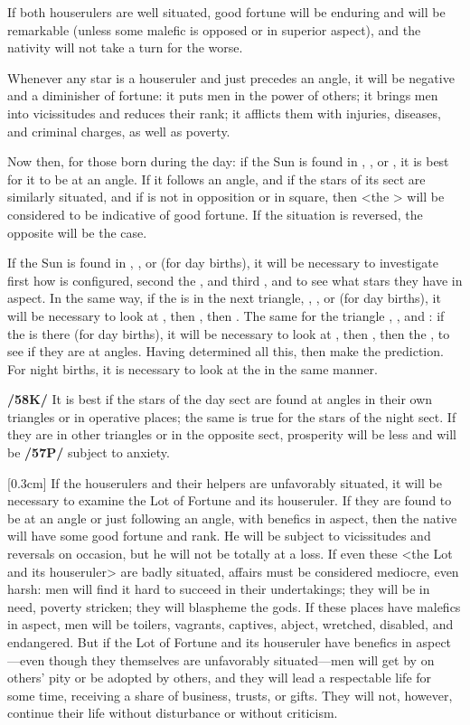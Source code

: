 If both houserulers are well situated, good fortune will be enduring and will be remarkable (unless some malefic is opposed or in superior aspect), and the nativity will not take a turn for the worse. 

Whenever any star is a houseruler and just precedes an angle, it will be negative and a diminisher of fortune: it puts men in the power of others; it brings men into vicissitudes and reduces their rank; it afflicts them with injuries, diseases, and criminal charges, as well as poverty.

Now then, for those born during the day: if the Sun is found in \Aries, \Leo, or \Sagittarius, it is best for it to be at an angle. If it follows an angle, and if the stars of its sect are similarly situated, and if \Mars\xspace is not in opposition or in square, then <the \Sun> will be considered to be indicative of good fortune. If the situation is reversed, the opposite will be the case. 

If the Sun is found in \Taurus, \Virgo, or \Capricorn\xspace (for day births), it will be necessary to investigate first how \Venus\xspace is configured, second the \Moon, and third
\Mars, and to see what stars they have in aspect. In the same way, if the \Sun\xspace is in the next triangle, \Gemini, \Libra, or \Aquarius\xspace (for day births), it will be necessary to look at \Saturn, then \Mercury, then \Jupiter. The same for the triangle \Cancer, \Scorpio, and \Pisces: if the \Sun\xspace is there (for day births), it will be necessary to look at \Venus, then \Mars, then the \Moon, to see if they are at angles. Having determined all this, then make the prediction. For night births, it is necessary to look at the \Moon\xspace in the same manner.

\mndl[0.2cm]
\textbf{/58K/} It is best if the stars of the day sect are found at angles in their own triangles or in operative
places; the same is true for the stars of the night sect. If they are in other triangles or in the opposite sect, prosperity will be less and will be \textbf{/57P/} subject to anxiety. 

\marginnote{\Fortune}[0.3cm]
If the houserulers and their helpers are unfavorably situated, it will be necessary to examine the Lot of Fortune and its houseruler. If they are found to be at an angle or just following an angle, with benefics in aspect, then the native will have some good fortune and rank. He will be subject to vicissitudes and reversals on occasion, but he will not be
totally at a loss. If even these <the Lot and its houseruler> are badly situated, affairs must be considered
mediocre, even harsh: men will find it hard to succeed in their undertakings; they will be in need, poverty stricken;
they will blaspheme the gods. If these places have malefics in aspect, men will be toilers, vagrants, captives, abject, wretched, disabled, and endangered. But if the Lot of Fortune and its houseruler have benefics in aspect—even though they themselves are unfavorably situated—men will get by on others’
pity or be adopted by others, and they will lead a respectable life for some time, receiving a share of business, trusts, or gifts. They will not, however, continue their life without disturbance or without criticism.

